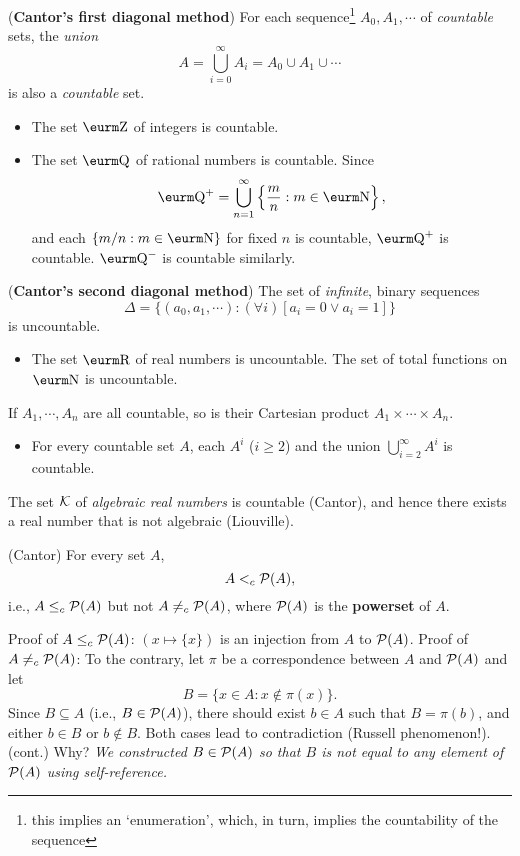 \documentclass{myproc}
\begin{document}
\item ({\bf{}Cantor's first diagonal method})
	For each sequence\footnote{this implies an `enumeration', which,
	in turn, implies the countability of the sequence} 
	$A_0, A_1, \cdots$ of {\em{}countable\/} sets,
	the {\em{}union\/}
		\[ A = \bigcup_{i = 0}^\infty{A_i} = A_0 \cup A_1 \cup \cdots \]
	is also a {\em{}countable\/} set.
	\begin{itemize}
	\w This technique is also called {\em{}dovetailing\/}, which
		is heavily used in computability proofs.
	\item The set ${\Z}$ of integers is countable.
	\item The set ${\Q}$ of rational numbers is countable. 
		\bit
		\w Since 
			\[ \Q^+ = \bigcup_{n=1}^\infty\left\{\frac{m}{n}: 
		m \in \N\right\},\]
		and each $\{m/n: m \in \N\}$ for fixed $n$ is countable,
		$\Q^+$ is countable. $\Q^-$ is countable similarly.
		\eit
	\end{itemize}
\item ({\bf{}Cantor's second diagonal method}) 
	The set of {\em{}infinite\/}, binary sequences
	\[ \Delta = \{(a_0, a_1, \cdots) : (\forall{i})[a_i = 0 \vee a_i = 1] \}\]
	is uncountable.
		\begin{itemize}
		\item The set $\R$ of real numbers is uncountable.
		\w The set of total functions on $\N$ is uncountable.
		\end{itemize}
\item If $A_1, \cdots, A_n$ are all countable, so is their Cartesian
	product $A_1 \times \cdots \times A_n$.
	\begin{itemize}
	\item For every countable set $A$, each $A^i$ ($i \ge 2$) and the
		union 
			$\bigcup_{i = 2}^\infty A^i$
		is countable.
	\end{itemize}
\item The set $\cal{}K$ of {\em{}algebraic real numbers\/} is countable
	(Cantor), and hence there exists a real number that is not
		 algebraic (Liouville).
\item (Cantor) For every set $A$,
	\[ A <_c {\cal{}P}(A), \] i.e.,
	$A \le_c {\cal{}P}(A)$ but not $A \ne_c {\cal{}P}(A)$,
	where ${\cal{}P}(A)$ is the 
	{\bf{}powerset} of $A$.
	\begin{itemize}
	\w Proof of $A \le_c {\cal{}P}(A)$:
	$(x \mapsto \{x\})$ is an injection from $A$ to ${\cal{}P}(A)$.
	\w Proof of $A \ne_c {\cal{}P}(A)$:
	To the contrary, 
	let $\pi$ be a correspondence between $A$ and ${\cal{}P}(A)$
	and let 
		\[ B = \{x \in A: x \not\in \pi(x)\}.\]
	Since $B \subseteq A$ (i.e., $B \in {\cal{}P}(A)$), 
	there should exist $b \in A$ such that
	$B = \pi(b)$, and either $b \in B$ or $b \not\in B$.
	Both cases lead to contradiction (Russell phenomenon!).
	\bit
	\w (cont.) Why? {\em{}We constructed $B \in {\cal{}P}(A)$ so that 
		$B$ is not equal to any element of ${\cal{}P}(A)$
		using self-reference.\/}
	\eit
	\end{itemize}
\end{document}
